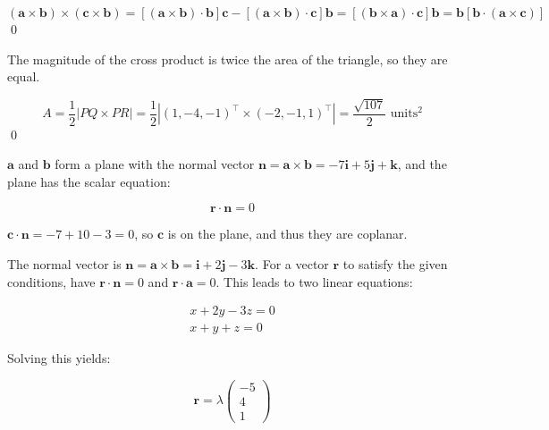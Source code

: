 \documentclass[12pt]{article}
\begin{document}

\begin{equation}
    (\mathbf{a} \times \mathbf{b}) \times (\mathbf{c} \times \mathbf{b}) = [(\mathbf{a} \times \mathbf{b}) \cdot \mathbf{b}] \mathbf{c} - [(\mathbf{a} \times \mathbf{b}) \cdot \mathbf{c}] \mathbf{b} = [(\mathbf{b} \times \mathbf{a}) \cdot \mathbf{c}] \mathbf{b} = \mathbf{b} [\mathbf{b} \cdot (\mathbf{a} \times \mathbf{c})]
\end{equation}
\qed



The magnitude of the cross product is twice the area of the triangle, so they are equal.


\begin{equation}
    A = \frac{1}{2} \left\lvert PQ \times PR \right\rvert = \frac{1}{2} \left\lvert (1, -4, -1)^{\intercal} \times (-2, -1, 1)^{\intercal} \right\rvert = \frac{\sqrt{107}}{2} \text{ units}^{2}
\end{equation}
\qed



$\mathbf{a}$ and $\mathbf{b}$ form a plane with the normal vector $\mathbf{n} = \mathbf{a} \times \mathbf{b} = -7 \mathbf{i} + 5 \mathbf{j} + \mathbf{k}$, and the plane has the scalar equation:

\begin{equation}
    \mathbf{r} \cdot \mathbf{n} = 0
\end{equation}

$\mathbf{c} \cdot \mathbf{n} = -7 + 10 - 3 = 0$, so $\mathbf{c}$ is on the plane, and thus they are coplanar.

The normal vector is $\mathbf{n} = \mathbf{a} \times \mathbf{b} = \mathbf{i} + 2 \mathbf{j} - 3 \mathbf{k}$. For a vector $\mathbf{r}$ to satisfy the given conditions, have $\mathbf{r} \cdot \mathbf{n} = 0$ and $\mathbf{r} \cdot \mathbf{a} = 0$. This leads to two linear equations:

\begin{equation}
    \begin{split}
        x + 2y - 3z = 0 \\
        x + y + z = 0
    \end{split}
\end{equation}

Solving this yields:

\begin{equation}
    \mathbf{r} = \lambda \begin{pmatrix}
        -5 \\
        4  \\
        1
    \end{pmatrix}
\end{equation}
\end{document}
